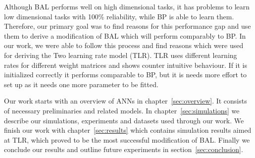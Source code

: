 

Although BAL performs well on high dimensional tasks, it has problems to learn low dimensional tasks with 100\% reliability, while BP is able to learn them. Therefore, our primary goal was to find reasons for this performance gap and use them to derive a modification of BAL which will perform comparably to BP. In our work, we were able to follow this process and find reasons which were used for deriving the Two learning rate model (TLR). TLR uses different learning rates for different weight matrices and shows counter intuitive behaviour. If it is initialized correctly it performs comparable to BP, but it is needs more effort to set up as it needs one more parameter to be fitted. 



Our work starts with an overview of ANNs in chapter~\ref{sec:overview}. It consists of necessary preliminaries and related models. 
In chapter~\ref{sec:simulations} we describe our simulations, experiments and datasets used through our work. 
We finish our work with chapter~\ref{sec:results} which contains simulation results aimed at TLR, which proved to be the most successful modification of BAL. Finally we conclude our results and outline future experiments in section~\ref{sec:conclusion}. %




